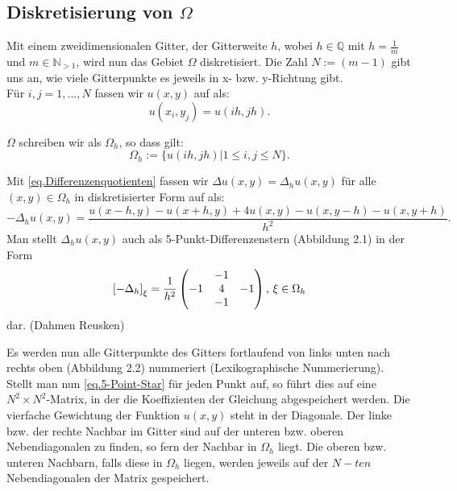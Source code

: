 \subsection{Diskretisierung von $\Omega$}\label{ss.Diskretisierung}

Mit einem zweidimensionalen Gitter, der Gitterweite $h$, wobei $h \in \mathbb{Q}$ mit $h = \frac {1} {m}$ und $m \in \mathbb{N}_{>1}$, wird nun das Gebiet $\Omega$ diskretisiert. Die Zahl $N := (m-1)$ gibt uns an, wie viele Gitterpunkte es jeweils in x- bzw. y-Richtung gibt.\\

Für $i,j = 1,...,N$ fassen wir $u(x,y)$ auf als:
\begin{equation}
u(x_{i},y_{j}) = u(ih,jh).
\end{equation}

$\Omega$ schreiben wir als $\Omega_{h}$, so dass gilt:
\begin{equation}
\Omega_{h} := \{u(ih, jh) | 1 \le i,j \le N\}.
\end{equation}

\label{img.5-Point-Star}

Mit \autoref{eq.Differenzenquotienten} fassen wir $\Delta u(x,y) = \Delta_{h} u(x,y)$ für alle $(x,y) \in \Omega_{h}$ in diskretisierter Form auf als:
\begin{equation}
-\Delta_{h} u(x,y) = \frac {u(x-h,y) - u(x+h,y) + 4u(x,y) - u(x,y-h) - u(x,y+h)} {h^{2}}.\label{eq.5-Point-Star}
\end{equation}
Man stellt $\Delta_{h} u(x,y)$ auch als 5-Punkt-Differenzenstern (Abbildung 2.1) in der Form
\begin{equation}
\left[-\Delta_{h}\right]_{\xi} = \frac {1} {h^{2}}
\begin{pmatrix}
  & -1 & \\
-1 & 4 & -1 \\
  & -1 & 
\end{pmatrix}
\textnormal{, } \xi \in \Omega_{h}
\end{equation}
dar. (Dahmen Reusken)

\label{img.gridWithNumbers}

Es werden nun alle Gitterpunkte des Gitters fortlaufend von links unten nach rechts oben (Abbildung 2.2) nummeriert (Lexikographische Nummerierung). Stellt man nun \autoref{eq.5-Point-Star} für jeden Punkt auf, so führt dies auf eine $N^{2} \times N^{2}$-Matrix, in der die Koeffizienten der Gleichung abgespeichert werden. Die vierfache Gewichtung der Funktion $u(x,y)$ steht in der Diagonale. Der linke bzw. der rechte Nachbar im Gitter sind auf der unteren bzw. oberen Nebendiagonalen zu finden, so fern der Nachbar in $\Omega_{h}$ liegt. Die oberen bzw. unteren Nachbarn, falls diese in $\Omega_{h}$ liegen, werden jeweils auf der $N-ten$ Nebendiagonalen der Matrix gespeichert.

